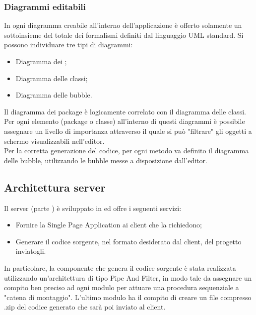 \documentclass[../DefinizioneDiProdotto.tex]{subfiles}
\begin{document}
				\subsubsection{Diagrammi editabili}
					In ogni diagramma creabile all'interno dell'applicazione è offerto solamente un
					sottoinsieme del totale dei formalismi definiti dal linguaggio UML standard.
					Si possono individuare tre tipi di diagrammi:
					\begin{itemize}
						\item Diagramma dei ;
						\item Diagramma delle classi;
						\item Diagramma delle bubble.
					\end{itemize}
					Il diagramma dei package è logicamente correlato con il diagramma delle classi. Per ogni
					elemento (package o classe) all'interno di questi diagrammi è possibile assegnare un
					livello di importanza attraverso il quale si può "filtrare" gli oggetti a schermo
					visualizzabili nell'editor.\\
					Per la corretta generazione del codice, per ogni metodo va definito il diagramma delle bubble, utilizzando le bubble messe a disposizione dall'editor.
			\subsection{Architettura server}
				Il server (parte ) è sviluppato in  ed offre i seguenti servizi:
				\begin{itemize}
					\item Fornire la Single Page Application ai client che la richiedono;
					\item Generare il codice sorgente, nel formato desiderato dal client, del progetto
					inviatogli.
				\end{itemize}
				In particolare, la componente che genera il codice sorgente è stata realizzata utilizzando
				un'architettura di tipo Pipe And Filter, in modo tale da assegnare un compito ben preciso
				ad ogni modulo per attuare una procedura sequenziale a "catena di montaggio". L'ultimo
				modulo ha il compito di creare un file compresso .zip del codice generato che sarà poi
				inviato al client.\\
\end{document}
